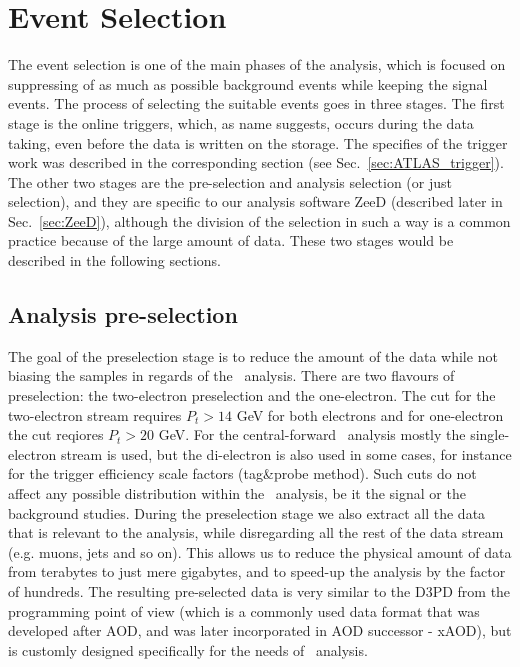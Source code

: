 \chapter{Event Selection}
\label{sec:Selection}

The event selection is one of the main phases of the analysis, which is focused on suppressing of as much as possible background events while keeping the signal events. The process of selecting the suitable events goes in three stages. The first stage is the online triggers, which, as name suggests, occurs during the data taking, even before the data is written on the storage. The specifies of the trigger work was described in the corresponding section (see Sec.~\ref{sec:ATLAS_trigger}). The other two stages are the pre-selection and analysis selection (or just selection), and they are specific to our analysis software ZeeD (described later in Sec.~\ref{sec:ZeeD}), although the division of the selection in such a way is a common practice because of the large amount of data. These two stages would be described in the following sections.

\section{Analysis pre-selection}
\label{sec:Sel_pre-sel}

The goal of the preselection stage is to reduce the amount of the data while not biasing the samples in regards of the \Zee\ analysis. There are two flavours of preselection: the two-electron preselection and the one-electron. The cut for the two-electron stream requires $P_{t} > 14$ GeV for both electrons and for one-electron the cut reqiores $P_{t} > 20$ GeV. For the central-forward \Zee\ analysis mostly the single-electron stream is used, but the di-electron is also used in some cases, for instance for the trigger efficiency scale factors (tag\&probe method). Such cuts do not affect any possible distribution within the \Zee\ analysis, be it the signal or the background studies. During the preselection stage we also extract all the data that is relevant to the analysis, while disregarding all the rest of the data stream (e.g. muons, jets and so on). This allows us to reduce the physical amount of data from terabytes to just mere gigabytes, and to speed-up the analysis by the factor of hundreds. The resulting pre-selected data is very similar to the D3PD from the programming point of view (which is a commonly used data format that was developed after AOD, and was later incorporated in AOD successor - xAOD), but is customly designed specifically for the needs of \Zee\ analysis.

